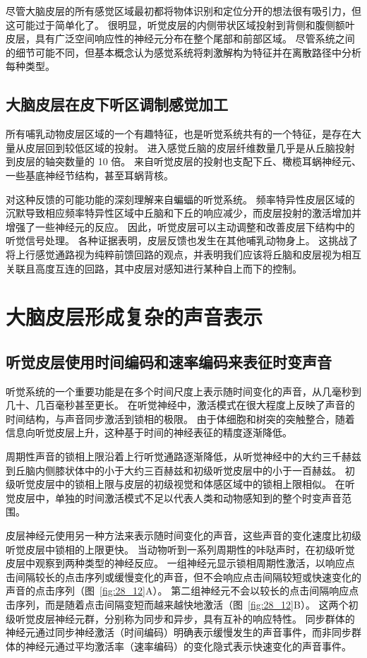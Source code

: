 尽管大脑皮层的所有感觉区域最初都将物体识别和定位分开的想法很有吸引力，但这可能过于简单化了。
很明显，听觉皮层的内侧带状区域投射到背侧和腹侧额叶皮层，具有广泛空间响应性的神经元分布在整个尾部和前部区域。
尽管系统之间的细节可能不同，但基本概念认为感觉系统将刺激解构为特征并在离散路径中分析每种类型。



\subsection{大脑皮层在皮下听区调制感觉加工}

所有哺乳动物皮层区域的一个有趣特征，也是听觉系统共有的一个特征，是存在大量从皮层回到较低区域的投射。
进入感觉丘脑的皮层纤维数量几乎是从丘脑投射到皮层的轴突数量的 10 倍。
来自听觉皮层的投射也支配下丘、橄榄耳蜗神经元、一些基底神经节结构，甚至耳蜗背核。


对这种反馈的可能功能的深刻理解来自蝙蝠的听觉系统。
频率特异性皮层区域的沉默导致相应频率特异性区域中丘脑和下丘的响应减少，而皮层投射的激活增加并增强了一些神经元的反应。
因此，听觉皮层可以主动调整和改善皮层下结构中的听觉信号处理。
各种证据表明，皮层反馈也发生在其他哺乳动物身上。
这挑战了将上行感觉通路视为纯粹前馈回路的观点，并表明我们应该将丘脑和皮层视为相互关联且高度互连的回路，其中皮层对感知进行某种自上而下的控制。



\section{大脑皮层形成复杂的声音表示}


\subsection{听觉皮层使用时间编码和速率编码来表征时变声音}

听觉系统的一个重要功能是在多个时间尺度上表示随时间变化的声音，从几毫秒到几十、几百毫秒甚至更长。
在听觉神经中，激活模式在很大程度上反映了声音的时间结构，与声音同步激活到锁相的极限。
由于体细胞和树突的突触整合，随着信息向听觉皮层上升，这种基于时间的神经表征的精度逐渐降低。


周期性声音的锁相上限沿着上行听觉通路逐渐降低，从听觉神经中的大约三千赫兹到丘脑内侧膝状体中的小于大约三百赫兹和初级听觉皮层中的小于一百赫兹。
初级听觉皮层中的锁相上限与皮层的初级视觉和体感区域中的锁相上限相似。
在听觉皮层中，单独的时间激活模式不足以代表人类和动物感知到的整个时变声音范围。


皮层神经元使用另一种方法来表示随时间变化的声音，这些声音的变化速度比初级听觉皮层中锁相的上限更快。
当动物听到一系列周期性的咔哒声时，在初级听觉皮层中观察到两种类型的神经反应。
一组神经元显示锁相周期性激活，以响应点击间隔较长的点击序列或缓慢变化的声音，但不会响应点击间隔较短或快速变化的声音的点击序列（图~\ref{fig:28_12}A）。
第二组神经元不会以较长的点击间隔响应点击序列，而是随着点击间隔变短而越来越快地激活（图~\ref{fig:28_12}B）。
这两个初级听觉皮层神经元群，分别称为同步和异步，具有互补的响应特性。
同步群体的神经元通过同步神经激活（时间编码）明确表示缓慢发生的声音事件，而非同步群体的神经元通过平均激活率（速率编码）的变化隐式表示快速变化的声音事件。


